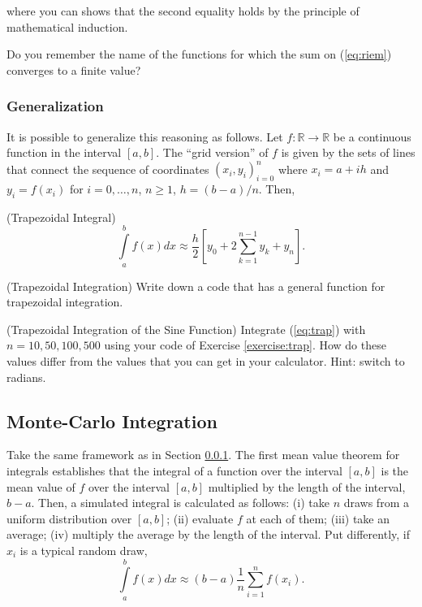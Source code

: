 \noindent where you can shows that the second equality holds by the principle of mathematical induction.

\begin{clue}
Do you remember the name of the functions for which the sum on (\ref{eq:riem}) converges to a finite value?
\end{clue}

\subsubsection{Generalization} \label{section:gen}
It is possible to generalize this reasoning as follows. Let $f: \mathbb{R} \rightarrow \mathbb{R}$ be a continuous function in the interval $[a,b]$. The ``grid version'' of $f$ is given by the sets of lines that connect the sequence of coordinates $(x_{i},y_{i})_{i=0}^{n}$ where $x_{i} = a + ih$ and $y_{i} = f(x_{i})$ for $i = 0, \ldots, n$, $n \geq 1$, $h = (b-a)/n$. Then,
\begin{definition} (Trapezoidal Integral)
\begin{equation}
\int \limits _{a} ^{b} f(x)dx \approx \frac{h}{2} \left[ y_{0} + 2 \sum \limits _{k=1} ^{n-1} y_{k} + y_{n}  \right].
\end{equation}
\end{definition}

\begin{exercise} (Trapezoidal Integration) \label{exercise:trap}
Write down a code that has a general function for trapezoidal integration.
\end{exercise}

\begin{exercise} (Trapezoidal Integration of the Sine Function)
Integrate (\ref{eq:trap}) with $n=10,50,100,500$ using your code of Exercise \ref{exercise:trap}. How do these values differ from the values that you can get in your calculator. Hint: switch to radians. 
\end{exercise}

\subsection{Monte-Carlo Integration}
Take the same framework as in Section \ref{section:gen}.  The first mean value theorem for integrals establishes that the integral of a function over the interval $[a,b]$ is the mean value of $f$ over the interval $[a,b]$ multiplied by the length of the interval, $b-a$. Then, a simulated integral is calculated as follows: (i) take $n$ draws from a uniform distribution over $[a,b]$; (ii) evaluate $f$ at each of them; (iii) take an average; (iv) multiply the average by the length of the interval. Put differently, if $x_{i}$ is a typical random draw,
\begin{equation}
\int \limits _{a} ^{b} f(x)dx \approx (b-a) \frac{1}{n} \sum \limits _{i=1} ^{n} f(x_{i}). 
\end{equation}  

